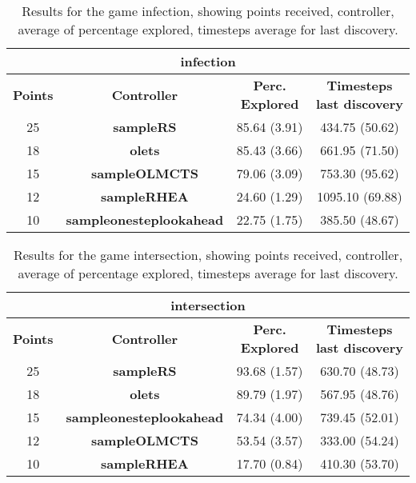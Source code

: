 \begin{table*}[!t]
\begin{center}
\begin{tabular}{|c|c|c|c|}
\multicolumn{4}{c}{\textbf{infection}}\\
\hline
\textbf{Points} & \textbf{Controller} & \textbf{Perc. Explored} &  \textbf{Timesteps last discovery}\\
\hline
25 & \textbf{sampleRS} & 85.64 (3.91) & 434.75 (50.62)
 \\
\hline
18 & \textbf{olets} & 85.43 (3.66) & 661.95 (71.50)
 \\
\hline
15 & \textbf{sampleOLMCTS} & 79.06 (3.09) & 753.30 (95.62)
 \\
\hline
12 & \textbf{sampleRHEA} & 24.60 (1.29) & 1095.10 (69.88)
 \\
\hline
10 & \textbf{sampleonesteplookahead} & 22.75 (1.75) & 385.50 (48.67)
 \\
\hline
\end{tabular}
\caption{Results for the game infection, showing points received, controller, average of percentage explored, timesteps average for last discovery.}
\label{tab:weights}
\end{center}
\end{table*}
\begin{table*}[!t]
\begin{center}
\begin{tabular}{|c|c|c|c|}
\multicolumn{4}{c}{\textbf{intersection}}\\
\hline
\textbf{Points} & \textbf{Controller} & \textbf{Perc. Explored} &  \textbf{Timesteps last discovery}\\
\hline
25 & \textbf{sampleRS} & 93.68 (1.57) & 630.70 (48.73)
 \\
\hline
18 & \textbf{olets} & 89.79 (1.97) & 567.95 (48.76)
 \\
\hline
15 & \textbf{sampleonesteplookahead} & 74.34 (4.00) & 739.45 (52.01)
 \\
\hline
12 & \textbf{sampleOLMCTS} & 53.54 (3.57) & 333.00 (54.24)
 \\
\hline
10 & \textbf{sampleRHEA} & 17.70 (0.84) & 410.30 (53.70)
 \\
\hline
\end{tabular}
\caption{Results for the game intersection, showing points received, controller, average of percentage explored, timesteps average for last discovery.}
\label{tab:weights}
\end{center}
\end{table*}
